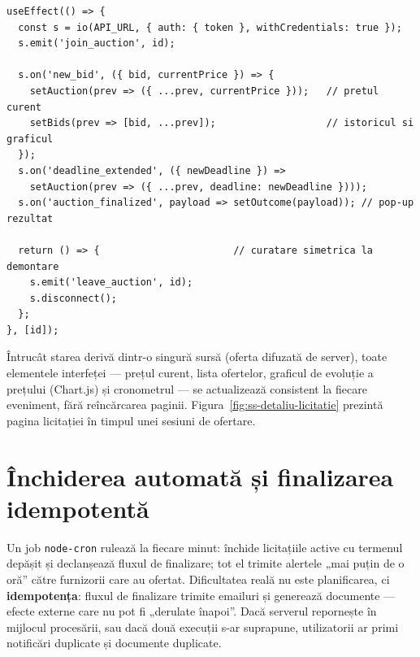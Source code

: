 \begin{lstlisting}[caption={Ciclul de viață al conexiunii pe client (fragment adaptat din client/src/pages/AuctionDetail.jsx)},label={lst:client-socket}]
useEffect(() => {
  const s = io(API_URL, { auth: { token }, withCredentials: true });
  s.emit('join_auction', id);

  s.on('new_bid', ({ bid, currentPrice }) => {
    setAuction(prev => ({ ...prev, currentPrice }));   // pretul curent
    setBids(prev => [bid, ...prev]);                   // istoricul si graficul
  });
  s.on('deadline_extended', ({ newDeadline }) =>
    setAuction(prev => ({ ...prev, deadline: newDeadline })));
  s.on('auction_finalized', payload => setOutcome(payload)); // pop-up rezultat

  return () => {                       // curatare simetrica la demontare
    s.emit('leave_auction', id);
    s.disconnect();
  };
}, [id]);
\end{lstlisting}

Întrucât starea derivă dintr-o singură sursă (oferta difuzată de server), toate elementele interfeței --- prețul curent, lista ofertelor, graficul de evoluție a prețului (Chart.js) și cronometrul --- se actualizează consistent la fiecare eveniment, fără reîncărcarea paginii. Figura~\ref{fig:ss-detaliu-licitatie} prezintă pagina licitației în timpul unei sesiuni de ofertare.


\section{Închiderea automată și finalizarea idempotentă}

Un job \texttt{node-cron} rulează la fiecare minut: închide licitațiile active cu termenul depășit și declanșează fluxul de finalizare; tot el trimite alertele „mai puțin de o oră'' către furnizorii care au ofertat. Dificultatea reală nu este planificarea, ci \textbf{idempotența}: fluxul de finalizare trimite emailuri și generează documente --- efecte externe care nu pot fi „derulate înapoi''. Dacă serverul repornește în mijlocul procesării, sau dacă două execuții s-ar suprapune, utilizatorii ar primi notificări duplicate și documente duplicate.

